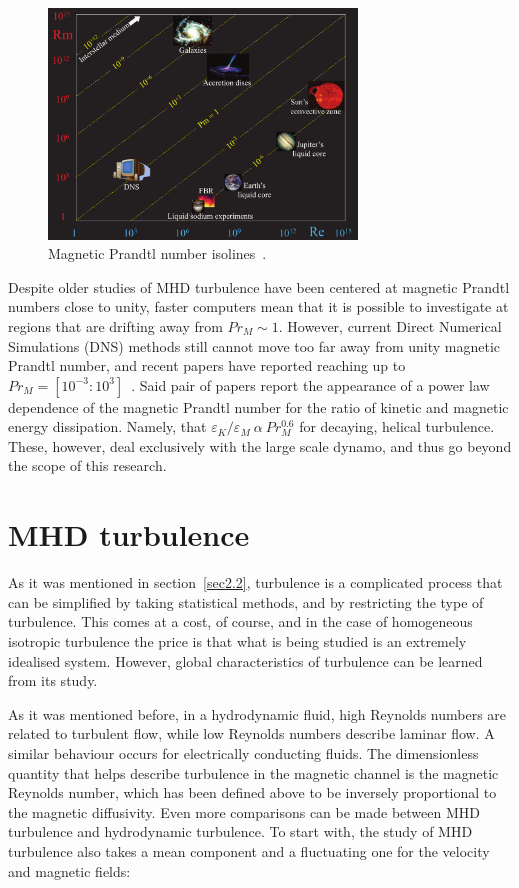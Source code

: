 \documentclass[12pt,a4paper]{report}
\begin{document}
\begin{figure}[!ht]
\centering
\includegraphics[width=0.73\textwidth]{img/PrM_spectrum}
\caption{Magnetic Prandtl number isolines~\cite{plunian2013shell}.}
\label{fig3.1}
\end{figure}

Despite older studies of MHD turbulence have been centered at magnetic Prandtl numbers close to unity, faster computers mean that it is possible to investigate at regions that are drifting away from $Pr_M\sim1$. However, current Direct Numerical Simulations (DNS) methods still cannot move too far away from unity magnetic Prandtl number, and recent papers have reported reaching up to $Pr_M=[10^{-3}:10^3]$~\cite{brandenburg2011dissipation, sahoo2011systematics}. Said pair of papers report the appearance of a power law dependence of the magnetic Prandtl number for the ratio of kinetic and magnetic energy dissipation. Namely, that $\varepsilon_K/\varepsilon_M~\alpha~Pr_M^{0.6}$ for decaying, helical turbulence. These, however, deal exclusively with the large scale dynamo, and thus go beyond the scope of this research.

\section{MHD turbulence}

As it was mentioned in section~\ref{sec2.2}, turbulence is a complicated process that can be simplified by taking statistical methods, and by restricting the type of turbulence. This comes at a cost, of course, and in the case of homogeneous isotropic turbulence the price is that what is being studied is an extremely idealised system. However, global characteristics of turbulence can be learned from its study.

As it was mentioned before, in a hydrodynamic fluid, high Reynolds numbers are related to turbulent flow, while low Reynolds numbers describe laminar flow. A similar behaviour occurs for electrically conducting fluids. The dimensionless quantity that helps describe turbulence in the magnetic channel is the magnetic Reynolds number, which has been defined above to be inversely proportional to the magnetic diffusivity. Even more comparisons can be made between MHD turbulence and hydrodynamic turbulence. To start with, the study of MHD turbulence also takes a mean component and a fluctuating one for the velocity and magnetic fields:
\end{document}

